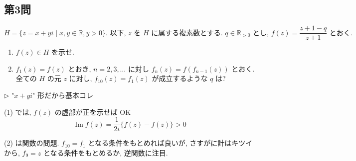 \documentclass[../main.tex]{subfiles}
\begin{document}
\subsection*{第3問}

\[
  H = \{ z = x + y i \mid x, y \in \mathbb{R}, y > 0 \}. \text{ 以下, } z \text{ を } H \text{ に属する複素数とする. } q \in \mathbb{R}_{>0} \text{ とし, } f(z) = \frac{z+1-q}{z+1} \text{ とおく.}
\]
\begin{enumerate}
  \item[(1)] $f(z) \in H$ を示せ.
  \item[(2)] $f_1(z) = f(z)$ とおき, $n = 2, 3, \dots$ に対し $f_n(z) = f(f_{n-1}(z))$ とおく. 全ての $H$ の元 $z$ に対し, $f_{10}(z) = f_1(z)$ が成立するような $q$ は?
\end{enumerate}

\bigskip

$\triangleright$ "$x + y i$" 形だから基本コレ

(1) では, $f(z)$ の虚部が正を示せば OK
\[
  \operatorname{Im} f(z) = \frac{1}{2i} \{ f(z) - \overline{f(z)} \} > 0
\]

(2) は関数の問題. $f_{10} = f_1$ となる条件をもとめれば良いが, さすがに計はキツイから, $f_9 = z$ となる条件をもとめるか, 逆関数に注目.
\end{document}
